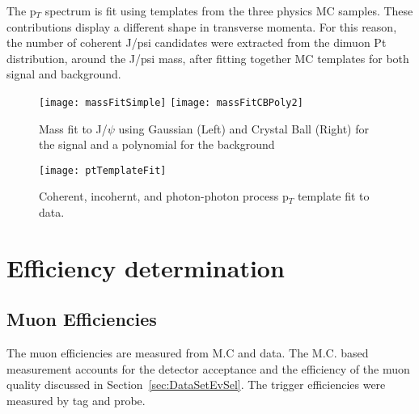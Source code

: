     The p$_{T}$ spectrum is fit using templates from the three physics MC samples. 
    These contributions display a different shape in transverse momenta. 
    For this reason, the number of coherent J/psi candidates were extracted 
      from the dimuon Pt distribution, around the J/psi mass, after fitting 
      together MC templates for both signal and background.

      \begin{figure*}[!Hhtb]
        \centering
        \texttt{[image: massFitSimple]}
        \texttt{[image: massFitCBPoly2]}
        \caption{Mass fit to J/$\psi$ using Gaussian (Left) and Crystal Ball (Right) for the 
          signal and a polynomial for the background}
        \label{fig:massFit}
      \end{figure*}

      \begin{figure}[!Hhtb]
        \centering
        \texttt{[image: ptTemplateFit]}
        \caption{Coherent, incohernt, and photon-photon process p$_{T}$ template fit to data.}
        \label{fig:ptTempFit}
      \end{figure}

  \section{\label{sec:effDet} Efficiency determination}
    \subsection{Muon Efficiencies}
      The muon efficiencies are measured from M.C and data.
      The M.C. based measurement accounts for the detector acceptance and the 
        efficiency of the muon quality discussed in 
        Section~\ref{sec:DataSetEvSel}.
      The trigger efficiencies were measured by tag and probe.
      
